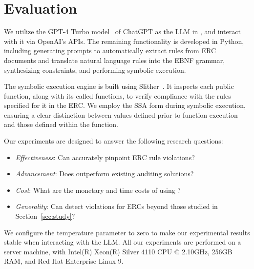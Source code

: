 \section{Evaluation}
\label{sec:eva}

We utilize the GPT-4 Turbo model~\cite{gpt4turbo} of ChatGPT 
as the LLM in \Tool{}, and interact 
with it via OpenAI's APIs. 
The remaining functionality is developed in Python, 
including %
generating prompts to automatically extract rules from ERC 
documents and translate natural language rules into the EBNF grammar, 
synthesizing constraints, and performing symbolic execution.

The symbolic execution engine is built using Slither~\cite{slither}. 
It inspects each public function, along with its called functions, 
to verify compliance with the rules specified for it in the ERC. 
We employ the SSA form during symbolic execution, 
ensuring a clear distinction between values defined prior to 
function execution and those defined within the function. 


















Our experiments are designed to answer the following research questions:
%
\begin{itemize}[noitemsep, topsep=0pt, leftmargin=.25in]

\item  \emph{Effectiveness}: Can \Tool{} accurately pinpoint ERC rule violations? 
\item  \emph{Advancement}: Does \Tool{} outperform existing auditing solutions?
\item  \emph{Cost}: What are the monetary and time costs of using \Tool{}?
\item  \emph{Generality}: Can \Tool{} detect violations for ERCs beyond those 
studied in Section~\ref{sec:study}?

\end{itemize}





We configure the temperature parameter to zero to make our experimental results
stable when interacting with the LLM. 
%
%
All our experiments are performed on a server machine, with Intel(R) Xeon(R) Silver 4110 CPU @ 2.10GHz, 256GB RAM, and Red Hat Enterprise Linux 9. 
 






